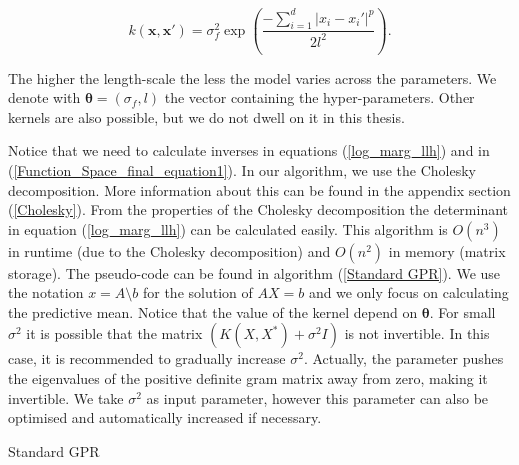 \documentclass[12pt,a4paper,oneside]{book}
\makeatletter
\def\BState{\State\hskip-\ALG@thistlm}
\makeatother
\begin{document}
\begin{equation}
k(\bm{x},\bm{x}') = \sigma_f^2 \exp \left( \dfrac{- \sum\nolimits_{i=1}^{d} | x_i - x_i'|^p}{2l^2} \right).
\end{equation}

The higher the length-scale the less the model varies across the parameters. We denote with $\bm{\theta} = (\sigma_f, l)$ the vector containing the hyper-parameters. Other kernels are also possible, but we do not dwell on it in this thesis. 

Notice that we need to calculate inverses in equations (\ref{log_marg_llh}) and in (\ref{Function_Space_final_equation1}). In our algorithm, we use the Cholesky decomposition. More information about this can be found in the appendix section (\ref{Cholesky}). From the properties of the Cholesky decomposition the determinant in equation (\ref{log_marg_llh}) can be calculated easily. This algorithm is $O(n^3)$ in runtime (due to the Cholesky decomposition) and $O(n^2)$ in memory (matrix storage). The pseudo-code can be found in algorithm (\ref{Standard GPR}). We use the notation $x = A \setminus b$ for the solution of $AX = b$ and we only focus on calculating the predictive mean. Notice that the value of the kernel depend on $\bm{\theta}$. For small $\sigma^2$ it is possible that the matrix $(K(X, X^{\ast}) + \sigma^2 I)$ is not invertible.  In this case, it is recommended to gradually increase $\sigma^2$. Actually, the parameter pushes the eigenvalues of the positive definite gram matrix away from zero, making it invertible. We take $\sigma^2$ as input parameter, however this parameter can also be optimised and automatically increased if necessary. 


\begin{algorithm}
\caption{Standard GPR}\label{Standard GPR}
\end{algorithm}
\end{document}
